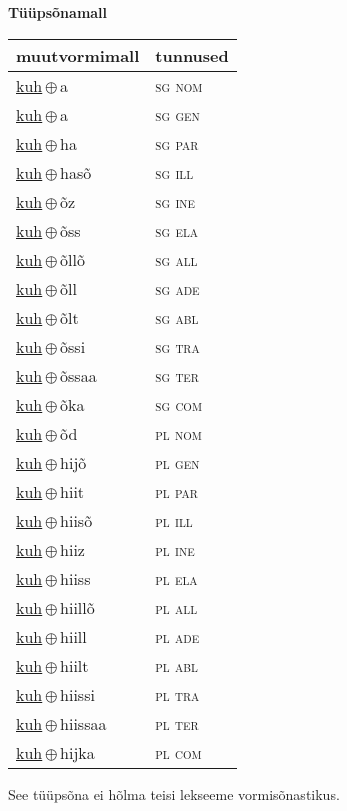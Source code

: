 

\vspace{3.5em}
\noindent \begin{minipage}{\textwidth}
\noindent \textbf{Tüüpsõnamall \,}\\

\begin{sideways}
\begin{tabular}{l l}
muutvormimall & tunnused \\
\hline
\underline{kuh}\,$\oplus$\,a & \textsc{ sg nom } \\
\underline{kuh}\,$\oplus$\,a & \textsc{ sg gen } \\
\underline{kuh}\,$\oplus$\,ha & \textsc{ sg par } \\
\underline{kuh}\,$\oplus$\,hasõ & \textsc{ sg ill } \\
\underline{kuh}\,$\oplus$\,õz & \textsc{ sg ine } \\
\underline{kuh}\,$\oplus$\,õss & \textsc{ sg ela } \\
\underline{kuh}\,$\oplus$\,õllõ & \textsc{ sg all } \\
\underline{kuh}\,$\oplus$\,õll & \textsc{ sg ade } \\
\underline{kuh}\,$\oplus$\,õlt & \textsc{ sg abl } \\
\underline{kuh}\,$\oplus$\,õssi & \textsc{ sg tra } \\
\underline{kuh}\,$\oplus$\,õssaa & \textsc{ sg ter } \\
\underline{kuh}\,$\oplus$\,õka & \textsc{ sg com } \\
\underline{kuh}\,$\oplus$\,õd & \textsc{ pl nom } \\
\underline{kuh}\,$\oplus$\,hijõ & \textsc{ pl gen } \\
\underline{kuh}\,$\oplus$\,hiit & \textsc{ pl par } \\
\underline{kuh}\,$\oplus$\,hiisõ & \textsc{ pl ill } \\
\underline{kuh}\,$\oplus$\,hiiz & \textsc{ pl ine } \\
\underline{kuh}\,$\oplus$\,hiiss & \textsc{ pl ela } \\
\underline{kuh}\,$\oplus$\,hiillõ & \textsc{ pl all } \\
\underline{kuh}\,$\oplus$\,hiill & \textsc{ pl ade } \\
\underline{kuh}\,$\oplus$\,hiilt & \textsc{ pl abl } \\
\underline{kuh}\,$\oplus$\,hiissi & \textsc{ pl tra } \\
\underline{kuh}\,$\oplus$\,hiissaa & \textsc{ pl ter } \\
\underline{kuh}\,$\oplus$\,hijka & \textsc{ pl com } \\
\end{tabular}
\end{sideways}
\label{tab:tüüpsõnamall-kuha}

\end{minipage}

 
\vspace{1em}
\noindent See tüüpsõna ei hõlma teisi lekseeme vormi\-sõnastikus.
